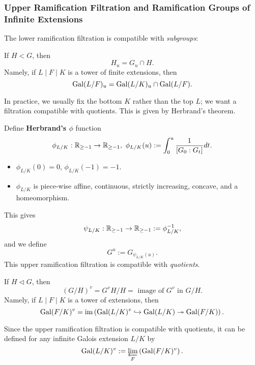 \subsubsection{Upper Ramification Filtration and Ramification Groups of Infinite Extensions}

The lower ramification filtration is compatible with \textit{subgroups}:
\begin{proposition}
    If $H < G$, then \[H_u = G_u\cap H.\]
    Namely, if $L\mid F\mid K$ is a tower of finite extensions,
    then \[\operatorname{Gal}(L/F)_u = \operatorname{Gal}(L/K)_u\cap \operatorname{Gal}(L/F).\]
\end{proposition}

In practice, we usually fix the bottom $K$ rather than the top $L$; we want a filtration compatible with quotients.
This is given by Herbrand's theorem.

Define \textbf{Herbrand's $\phi$} function\[\phi_{L/K} :\mathbb{R}_{\ge -1}\to\mathbb{R}_{\ge -1},\ \phi_{L/K}(u) := \int_0^u \frac{1}{[G_0 : G_t]}dt.\]
\begin{itemize}
    \item $\phi_{L/K}(0) = 0$, $\phi_{L/K}(-1) = -1$.
    \item $\phi_{L/K}$ is piece-wise affine, continuous, strictly increasing, concave, and a homeomorphism.
\end{itemize}
This gives \[\psi_{L/K} : \mathbb{R}_{\ge -1}\to\mathbb{R}_{\ge -1} := \phi_{L/K}^{-1},\]
and we define \[G^u := G_{\psi_{L/K}(u)}.\]
This upper ramification filtration is compatible with \textit{quotients}.
\begin{theorem}
    If $H\vartriangleleft G$,
    then \[(G/H)^v = G^vH/H = \text{ image of }G^v\text{ in }G/H.\]
    Namely, if $L\mid F\mid K$ is a tower of extensions,
    then \[\operatorname{Gal}(F/K)^v = \operatorname{im}\left( \operatorname{Gal}(L/K)^v\hookrightarrow\operatorname{Gal}(L/K)\twoheadrightarrow\operatorname{Gal}(F/K) \right).\]
\end{theorem}
Since the upper ramification filtration is compatible with quotients,
it can be defined for any infinite Galois extension $L/K$ by
\[\operatorname{Gal}(L/K)^v := \varprojlim_F\left( \operatorname{Gal}(F/K)^v \right).\]




